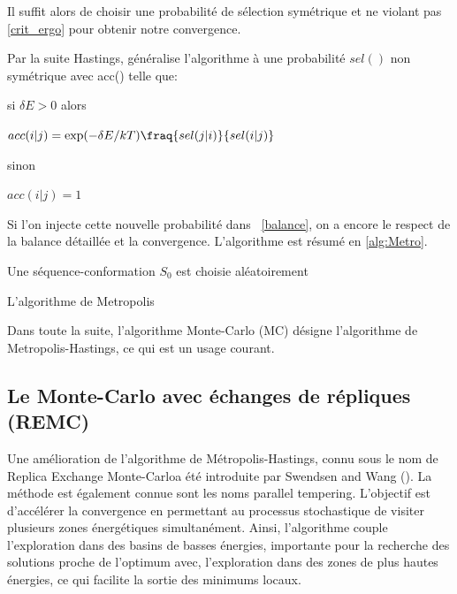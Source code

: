 Il suffit alors de choisir une probabilité de sélection symétrique et ne violant pas \ref{crit_ergo} pour obtenir notre convergence.


Par la suite Hastings, généralise l'algorithme à une probabilité $sel()$ non symétrique avec acc() telle que:


si
$\delta E >0$
alors

$acc(i|j) = \exp(- \delta E/kT) \fraq{sel(j|i)}{sel(i|j)}$

sinon

$acc(i|j)=1$


Si l'on injecte cette nouvelle probabilité dans ~\ref{balance}, on a encore le respect de la balance détaillée et la convergence. L'algorithme est résumé en \ref{alg:Metro}.


\begin{algorithm}
  \label{alg:Metro}
  Une séquence-conformation $S_0$ est choisie aléatoirement\;
\caption{L'algorithme de Metropolis}  
\end{algorithm}


Dans toute la suite, l'algorithme Monte-Carlo (MC) désigne l'algorithme de Metropolis-Hastings, ce qui est un usage courant.

\subsection{Le Monte-Carlo avec échanges de répliques (REMC)}


Une amélioration de l'algorithme de Métropolis-Hastings, connu sous le nom de \og Replica Exchange Monte-Carlo\fg a été introduite par Swendsen and Wang (\cite{Swendsen82}). La méthode est également connue sont les noms \og parallel tempering\fg. L'objectif est d'accélérer la convergence en permettant au processus stochastique de visiter plusieurs zones énergétiques simultanément. Ainsi, l'algorithme couple l'exploration dans des basins de basses énergies, importante pour la recherche des solutions proche de l'optimum avec, l'exploration dans des zones de plus hautes énergies, ce qui facilite la sortie des minimums locaux.

